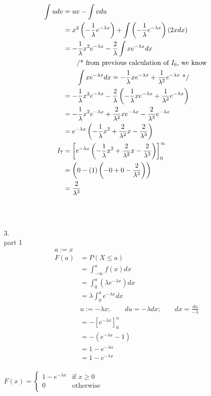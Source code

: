 \documentclass[12pt,border=4pt,multi]{article}%
\begin{document}
\begin{align*}
\int udv &= uv - \int vdu\\
&= x^2\left( -\frac{1}{\lambda} e^{-\lambda x}\right) + \int\left( -\frac{1}{\lambda} e^{-\lambda x}\right)\left(2xdx\right)\\
&= -\frac{1}{\lambda} x^2e^{-\lambda x} - \frac{2}{\lambda}\int xe^{-\lambda x}dx\\
&\text{\qquad/* from previous calculation of $I_6$, we know }\\
&\text{\qquad}\int xe^{-\lambda x}dx= -\frac{1}{\lambda} xe^{-\lambda x} + \frac{1}{\lambda^2}e^{-\lambda x} \text{ */}\\ 
&= -\frac{1}{\lambda} x^2e^{-\lambda x} - \frac{2}{\lambda}\left(-\frac{1}{\lambda} xe^{-\lambda x} + \frac{1}{\lambda^2}e^{-\lambda x}\right)\\
&= -\frac{1}{\lambda} x^2e^{-\lambda x} + \frac{2}{\lambda^2}xe^{-\lambda x} - \frac{2}{\lambda^3}e^{-\lambda x}\\
&= e^{-\lambda x} \left(-\frac{1}{\lambda}x^2 + \frac{2}{\lambda^2}x - \frac{2}{\lambda^3}\right)\\
I_7 &= \left[e^{-\lambda x} \left(-\frac{1}{\lambda}x^2 + \frac{2}{\lambda^2}x - \frac{2}{\lambda^3}\right)\right]_0^{\infty}\\
&= \left(0 - (1)\left(-0 + 0 - \frac{2}{\lambda^3}\right)\right)\\
&= \frac{2}{\lambda^3}\\
\end{align*}
\\
\\
\\
3.\\
part 1
\begin{align*}
a := x\\
F(a) &= P(X \leq a)\\
&= \int_{-\infty}^a f(x) dx\\
&= \int_0^a \left(\lambda e^{-\lambda x}\right) dx\\
&= \lambda \int_0^a e^{-\lambda x} dx\\
&u := -\lambda x; \qquad du = -\lambda dx; \qquad dx = \frac{du}{-\lambda}\\
&= -\left[e^{-\lambda x}\right]_0^a\\
&= -\left(e^{-\lambda a} - 1\right)\\
&= 1 - e^{-\lambda a}\\
&=  1 - e^{-\lambda x}\\
\end{align*}
\begin{center}
$\boxed{F(x) = 
\begin{cases}
1 - e^{-\lambda x} & \text{if } x \geq 0\\
0 & \text{otherwise}\\ 
\end{cases}}$\\
\end{center}
\end{document}
